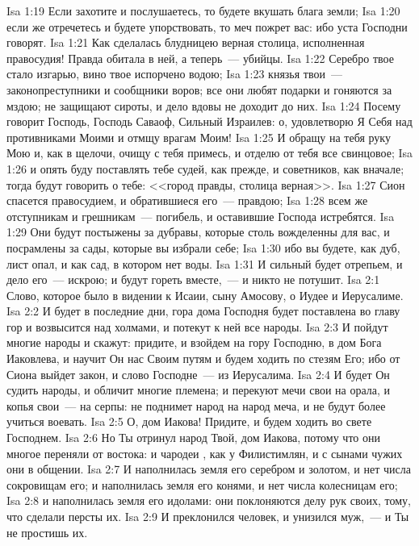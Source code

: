 \vs Isa 1:19 Если захотите и послушаетесь, то будете вкушать блага земли;
\vs Isa 1:20 если же отречетесь и будете упорствовать, то меч пожрет вас: ибо уста Господни говорят.
\vs Isa 1:21 Как сделалась блудницею верная столица, исполненная правосудия! Правда обитала в ней, а теперь~--- убийцы.
\vs Isa 1:22 Серебро твое стало изгарью, вино твое испорчено водою;
\vs Isa 1:23 князья твои~--- законопреступники и сообщники воров; все они любят подарки и гоняются за мздою; не защищают сироты, и дело вдовы не доходит до них.
\rsbpar\vs Isa 1:24 Посему говорит Господь, Господь Саваоф, Сильный Израилев: о, удовлетворю Я Себя над противниками Моими и отмщу врагам Моим!
\vs Isa 1:25 И обращу на тебя руку Мою и, как в щелочи, очищу с тебя примесь, и отделю от тебя все свинцовое;
\vs Isa 1:26 и опять буду поставлять тебе судей, как прежде, и советников, как вначале; тогда будут говорить о тебе: <<город правды, столица верная>>.
\vs Isa 1:27 Сион спасется правосудием, и обратившиеся  его~--- правдою;
\vs Isa 1:28 всем же отступникам и грешникам~--- погибель, и оставившие Господа истребятся.
\vs Isa 1:29 Они будут постыжены за дубравы, которые столь вожделенны для вас, и посрамлены за сады, которые вы избрали себе;
\vs Isa 1:30 ибо вы будете, как дуб,  лист опал, и как сад, в котором нет воды.
\vs Isa 1:31 И сильный будет отрепьем, и дело его~--- искрою; и будут гореть вместе,~--- и никто не потушит.
\vs Isa 2:1 Слово, которое было в видении к Исаии, сыну Амосову, о Иудее и Иерусалиме.
\vs Isa 2:2 И будет в последние дни, гора дома Господня будет поставлена во главу гор и возвысится над холмами, и потекут к ней все народы.
\vs Isa 2:3 И пойдут многие народы и скажут: придите, и взойдем на гору Господню, в дом Бога Иаковлева, и научит Он нас Своим путям и будем ходить по стезям Его; ибо от Сиона выйдет закон, и слово Господне~--- из Иерусалима.
\vs Isa 2:4 И будет Он судить народы, и обличит многие племена; и перекуют мечи свои на орала, и копья свои~--- на серпы: не поднимет народ на народ меча, и не будут более учиться воевать.
\rsbpar\vs Isa 2:5 О, дом Иакова! Придите, и будем ходить во свете Господнем.
\vs Isa 2:6 Но Ты отринул народ Твой, дом Иакова, потому что они многое переняли от востока: и чародеи , как у Филистимлян, и с сынами чужих они в общении.
\vs Isa 2:7 И наполнилась земля его серебром и золотом, и нет числа сокровищам его; и наполнилась земля его конями, и нет числа колесницам его;
\vs Isa 2:8 и наполнилась земля его идолами: они поклоняются делу рук своих, тому, что сделали персты их.
\vs Isa 2:9 И преклонился человек, и унизился муж,~--- и Ты не простишь их.
